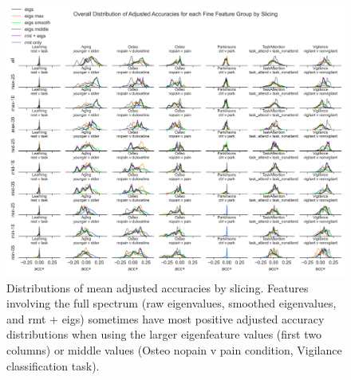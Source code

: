 \documentclass{article}  %
\begin{document}
\begin{figure}[H]
\begin{center}
\includegraphics[width=\textwidth,height=0.9\textheight,keepaspectratio]{rmt_eigs_accs_by_subgroup_and_slicing.png}
\end{center}
\caption
{ \label{fig:best-params-slicing-acc} Distributions of mean adjusted accuracies
by slicing. Features involving the full spectrum (raw eigenvalues, smoothed
eigenvalues, and rmt + eigs) sometimes have most positive adjusted accuracy
distributions when using the larger eigenfeature values (first two columns)
or middle values (Osteo nopain v pain condition, Vigilance classification
task).}
\end{figure}
\end{document}

